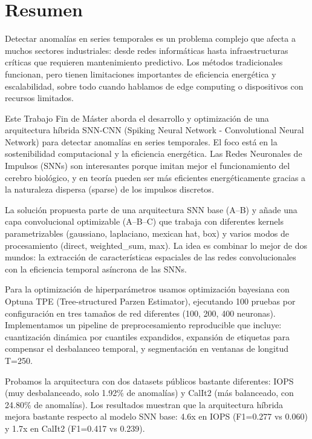 \chapter*{Resumen}
\label{chap:resumen}


Detectar anomalías en series temporales es un problema complejo que afecta a muchos sectores industriales: desde redes informáticas hasta infraestructuras críticas que requieren mantenimiento predictivo. Los métodos tradicionales funcionan, pero tienen limitaciones importantes de eficiencia energética y escalabilidad, sobre todo cuando hablamos de edge computing o dispositivos con recursos limitados.

Este Trabajo Fin de Máster aborda el desarrollo y optimización de una arquitectura híbrida SNN-CNN (Spiking Neural Network - Convolutional Neural Network) para detectar anomalías en series temporales. El foco está en la sostenibilidad computacional y la eficiencia energética. Las Redes Neuronales de Impulsos (SNNs) son interesantes porque imitan mejor el funcionamiento del cerebro biológico, y en teoría pueden ser más eficientes energéticamente gracias a la naturaleza dispersa (sparse) de los impulsos discretos.

La solución propuesta parte de una arquitectura SNN base (A--B) y añade una capa convolucional optimizable (A--B--C) que trabaja con diferentes kernels parametrizables (gaussiano, laplaciano, mexican hat, box) y varios modos de procesamiento (direct, weighted\_sum, max). La idea es combinar lo mejor de dos mundos: la extracción de características espaciales de las redes convolucionales con la eficiencia temporal asíncrona de las SNNs.

Para la optimización de hiperparámetros usamos optimización bayesiana con Optuna TPE (Tree-structured Parzen Estimator), ejecutando 100 pruebas por configuración en tres tamaños de red diferentes (100, 200, 400 neuronas). Implementamos un pipeline de preprocesamiento reproducible que incluye: cuantización dinámica por cuantiles expandidos, expansión de etiquetas para compensar el desbalanceo temporal, y segmentación en ventanas de longitud T=250.

Probamos la arquitectura con dos datasets públicos bastante diferentes: IOPS (muy desbalanceado, solo 1.92\% de anomalías) y CalIt2 (más balanceado, con 24.80\% de anomalías). Los resultados muestran que la arquitectura híbrida mejora bastante respecto al modelo SNN base: 4.6x en IOPS (F1=0.277 vs 0.060) y 1.7x en CalIt2 (F1=0.417 vs 0.239).

